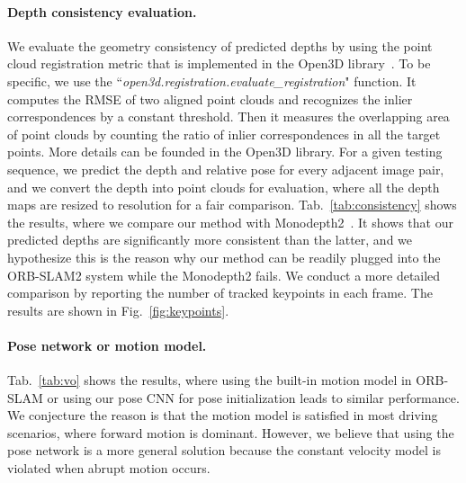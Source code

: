 \documentclass[twocolumn]{svjour3}
\renewcommand{\cite}[1]{\textcolor{blue}{\citep{#1}}}
\newcommand{\figref}[1]{Fig.~\ref{#1}}
\newcommand{\tabref}[1]{Tab.~\ref{#1}}
\begin{document}
\paragraph{Depth consistency evaluation.}
We evaluate the geometry consistency of predicted depths by using the point cloud registration metric that is implemented in the Open3D library~\cite{Zhou2018}.
To be specific, we use the ``\emph{open3d.registration.evaluate\_registration}" function.
It computes the RMSE of two aligned point clouds and recognizes the inlier correspondences by a constant threshold.
Then it measures the overlapping area of point clouds by counting the ratio of inlier correspondences in all the target points.
More details can be founded in the Open3D library.
For a given testing sequence, we predict the depth and relative pose for every adjacent image pair,
and we convert the depth into point clouds for evaluation,
where all the depth maps are resized to  resolution for a fair comparison.
\tabref{tab:consistency} shows the results,
where we compare our method with Monodepth2~\cite{monodepth2}.
It shows that our predicted depths are significantly more consistent than the latter,
and we hypothesize this is the reason why our method can be readily plugged into the ORB-SLAM2 system while the Monodepth2 fails.
We conduct a more detailed comparison by reporting the number of tracked keypoints in each frame.
The results are shown in \figref{fig:keypoints}.



\paragraph{Pose network or motion model.}
\tabref{tab:vo} shows the results, where using the built-in motion model in ORB-SLAM or using our pose CNN for pose initialization leads to similar performance.
We conjecture the reason is that the motion model is satisfied in most driving scenarios,
where forward motion is dominant.
However, we believe that using the pose network is a more general solution because the constant velocity model is violated when abrupt motion occurs.
\end{document}
